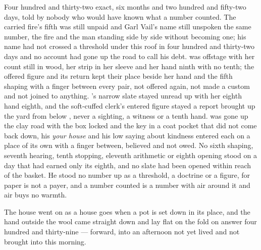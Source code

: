 Four hundred and thirty-two exact, six months and two hundred and fifty-two days, told by nobody who would have known what a number counted. The carried fire's fifth was still unpaid and Garl Vail's name still unspoken the same number, the fire and the man standing side by side without becoming one; his name had not crossed a threshold under this roof in four hundred and thirty-two days and no account had gone up the road to call his debt.  was offstage with her count still in wood, her strip in her sleeve and her hand ninth with no tenth; the offered figure and its return kept their place beside her hand and the fifth shaping with a finger between every pair, not offered again, not made a custom and not joined to anything. 's narrow slate stayed unread up  with her eighth hand eighth, and the soft-cuffed clerk's entered figure stayed a report brought up the yard from  below , never a sighting, a witness or a tenth hand.  was gone up the clay road with the box locked and the key in a coat pocket that did not come back down, his \emph{your house} and his low saying about kindness entered each on a place of its own with a finger between, believed and not owed. No sixth shaping, seventh hearing, tenth stopping, eleventh arithmetic or eighth opening stood on a day that had earned only its eighth, and no slate had been opened within reach of the basket. He stood no number up as a threshold, a doctrine or a figure, for paper is not a payer, and a number counted is a number with air around it and air buys no warmth.

The house went on as a house goes when a pot is set down in its place, and the hand outside the wool came straight down and lay flat on the fold on answer four hundred and thirty-nine --- forward, into an afternoon not yet lived and not brought into this morning.
